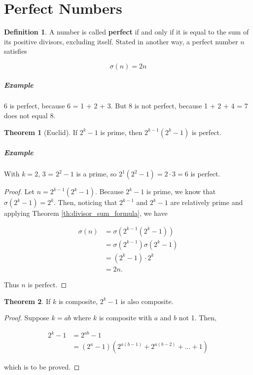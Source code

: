\documentclass{article}
\theoremstyle{definition} %
\newtheorem{theorem}{Theorem}[section] %
\theoremstyle{definition}
\theoremstyle{definition}
\theoremstyle{definition}
\newtheorem{definition}{Definition}[section]
\begin{document}
  \section{Perfect Numbers}
  
  \begin{definition}
    A number is called \textbf{perfect} if and only if it is equal to the sum of its positive
    divisors, excluding itself. Stated in another way, a perfect number $n$ satisfies
    
    \[ \sigma(n) = 2n \]
  \end{definition}
  
  \subparagraph{Example} 6 is perfect, because 6 = 1 + 2 + 3. But 8 is not perfect, because
  1 + 2 + 4 = 7 does not equal 8.
  
  \begin{theorem}[Euclid]
    If $2^k - 1$ is prime, then $2^{k - 1}(2^k - 1)$ is perfect.
  \end{theorem}
  
  \subparagraph{Example} With $k = 2$, 3 = $2^2 - 1$ is a prime, so $2^1 (2^2 - 1) = 2 \cdot 3 = 6$
  is perfect.
  
  \begin{proof}
    Let $n = 2^{k - 1}(2^k - 1)$. Because $2^k - 1$ is prime, we know that $\sigma(2^k - 1) =
    2^k$. Then, noticing that $2^{k - 1}$ and $2^k - 1$ are relatively prime and applying Theorem
    \ref{th:divisor_sum_formula}, we have
    
    \begin{align*}
      \sigma(n) &= \sigma(2^{k - 1}(2^k - 1)) \\
        &= \sigma(2^{k - 1})\sigma(2^k - 1) \\
        &= (2^k - 1) \cdot 2^k \\
        &= 2n.
    \end{align*}
    
    Thus $n$ is perfect.
  \end{proof}
  
  \begin{theorem}
    If $k$ is composite, $2^k - 1$ is also composite.
  \end{theorem}
  
  \begin{proof}
    Suppose $k = ab$ where $k$ is composite with $a$ and $b$ not 1. Then,
    
    \begin{align*}
      2^k - 1 &= 2^{ab} - 1 \\
        &= (2^a - 1)(2^{a(b - 1)} + 2^{a(b - 2)} + \dots + 1)
    \end{align*}
    
    which is to be proved.
  \end{proof}
  
\end{document}

